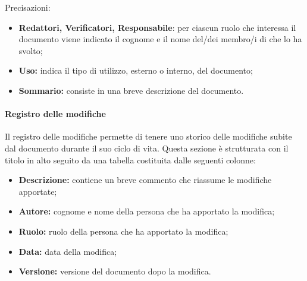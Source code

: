 Precisazioni:
\begin{itemize}
	
	\item \textbf{Redattori, Verificatori, Responsabile}: per ciascun ruolo che interessa il documento viene indicato il cognome e il nome del/dei membro/i di \groupName{} che lo ha svolto;
	\item \textbf{Uso:} indica il tipo di utilizzo, esterno o interno, del documento;
	\item \textbf{Sommario:} consiste in una breve descrizione del documento.
\end{itemize}

\paragraph{Registro delle modifiche}
Il registro delle modifiche permette di tenere uno storico delle modifiche subite dal documento durante il suo ciclo di vita. Questa sezione è strutturata con il titolo in alto seguito da una tabella costituita dalle seguenti colonne:

\begin{itemize}
	\item \textbf{Descrizione:} contiene un breve commento che riassume le modifiche apportate;
	\item \textbf{Autore:} cognome e nome della persona che ha apportato la modifica;
	\item \textbf{Ruolo:} ruolo della persona che ha apportato la modifica;
	\item \textbf{Data:} data della modifica;
	\item \textbf{Versione:} versione del documento dopo la modifica.
\end{itemize}

